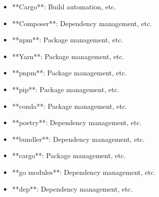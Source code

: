 \documentclass[11pt,a4paper]{article}
\begin{document}
\begin{itemize}
\item **Cargo**: Build automation, etc.
\end{itemize}

\begin{itemize}
\item **Composer**: Dependency management, etc.
\end{itemize}

\begin{itemize}
\item **npm**: Package management, etc.
\end{itemize}

\begin{itemize}
\item **Yarn**: Package management, etc.
\end{itemize}

\begin{itemize}
\item **pnpm**: Package management, etc.
\end{itemize}

\begin{itemize}
\item **pip**: Package management, etc.
\end{itemize}

\begin{itemize}
\item **conda**: Package management, etc.
\end{itemize}

\begin{itemize}
\item **poetry**: Dependency management, etc.
\end{itemize}

\begin{itemize}
\item **bundler**: Dependency management, etc.
\end{itemize}

\begin{itemize}
\item **cargo**: Package management, etc.
\end{itemize}

\begin{itemize}
\item **go modules**: Dependency management, etc.
\end{itemize}

\begin{itemize}
\item **dep**: Dependency management, etc.
\end{itemize}
\end{document}
